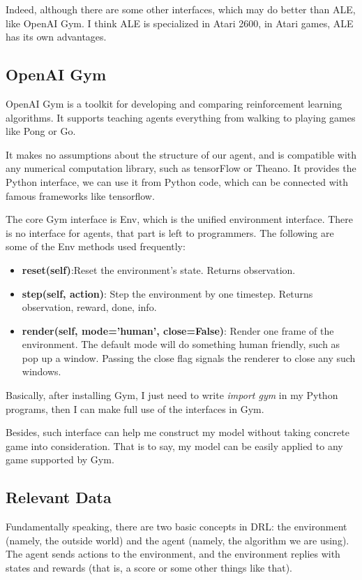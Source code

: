 \documentclass[10pt,twocolumn,letterpaper]{article}
\begin{document}
   	Indeed, although there are some other interfaces, which may do better than ALE, like OpenAI Gym. I think ALE is specialized in Atari 2600, in Atari games, ALE has its own advantages.
    
    \subsection{OpenAI Gym}
    OpenAI Gym is a toolkit for developing and comparing reinforcement learning algorithms. It supports teaching agents everything from walking to playing games like Pong or Go.
    
    It makes no assumptions about the structure of our agent, and is compatible with any numerical computation library, such as tensorFlow or Theano. It provides the Python interface, we can use it from Python code, which can be connected with famous frameworks like tensorflow.
    
    The core Gym interface is Env, which is the unified environment interface. There is no interface for agents, that part is left to programmers. The following are some of the Env methods used frequently:
    
	\begin{itemize}
 		\item \textbf{reset(self)}:Reset the environment's state. Returns observation.
 		\item \textbf{step(self, action)}: Step the environment by one timestep. Returns observation, reward, done, info.
 		\item \textbf{render(self, mode='human', close=False)}: Render one frame of the environment. The default mode will do something human friendly, such as pop up a window. Passing the close flag signals the renderer to close any such windows.
 	\end{itemize}
    
    Basically, after installing Gym, I just need to write \textit{import gym} in my Python programs, then I can make full use of the interfaces in Gym.
    
    Besides, such interface can help me construct my model without taking concrete game into consideration. That is to say, my model can be easily applied to any game supported by Gym.
    
    \subsection{Relevant Data}

    Fundamentally speaking, there are two basic concepts in DRL: the environment (namely, the outside world) and the agent (namely, the algorithm we are using). The agent sends actions to the environment, and the environment replies with states and rewards (that is, a score or some other things like that).
    
\end{document}
